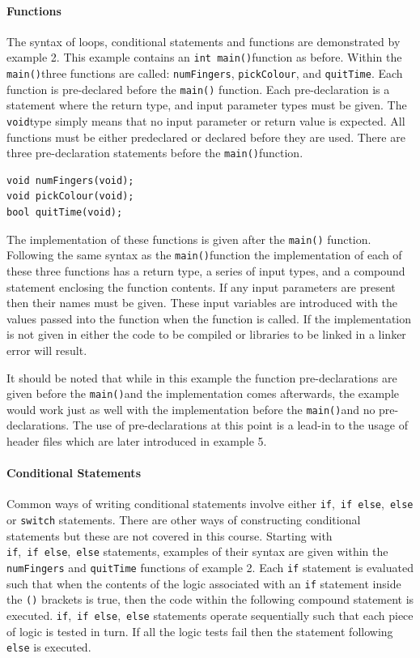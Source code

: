 \documentclass[11pt]{scrartcl}
\def\main{\texttt{main()}}
\def\intmain{\texttt{int main()}}
\def\void{\texttt{void}}
\begin{document}
\paragraph{Functions}
The syntax of loops, conditional statements and functions are
demonstrated by example 2.  This example contains an \intmain function
as before.  Within the \main three functions are called:
\texttt{numFingers}, \texttt{pickColour}, and
\texttt{quitTime}.  Each function is pre-declared before the \main
function.  Each pre-declaration is a statement where the return type,
and input parameter types must be given.  The \void type simply means that
no input parameter or return value is expected.  All functions must be
either predeclared or declared before they are used.  There are three
pre-declaration statements before the \main function.
\begin{lstlisting}
void numFingers(void);
void pickColour(void);
bool quitTime(void);
\end{lstlisting}
The implementation of these functions is given after the \main
function.  Following the same syntax as the \main function the
implementation of each of these three functions has a return type, a
series of input types, and a compound statement enclosing the function
contents.  If any input parameters are present then their names must
be given.  These input variables are introduced with the values passed
into the function when the function is called.  If the implementation
is not given in either the code to be compiled or libraries to be
linked in a linker error will result.

It should be noted that while in this example the function
pre-declarations are given before the \main and the implementation
comes afterwards, the example would work just as well with the
implementation before the \main and no pre-declarations.  The use of
pre-declarations at this point is a lead-in to the usage of header
files which are later introduced in example 5.

\paragraph{Conditional Statements}
Common ways of writing conditional statements involve either
\texttt{if},~\texttt{if~else},~\texttt{else} or \texttt{switch}
statements.  There are other ways of constructing conditional
statements but these are not covered in this course.  Starting with
\texttt{if},~\texttt{if~else},~\texttt{else} statements, examples of
their syntax are given within the \texttt{numFingers} and \texttt{quitTime}
functions of example 2.  Each \texttt{if} statement is evaluated such
that when the contents of the logic associated with an \texttt{if} statement
inside the \texttt{()} brackets is true, then the code within the
following compound statement is executed.
\texttt{if},~\texttt{if~else},~\texttt{else} statements operate
sequentially such that each piece of logic is tested in turn.  If all
the logic tests fail then the statement following \texttt{else} is
executed.
\end{document}
